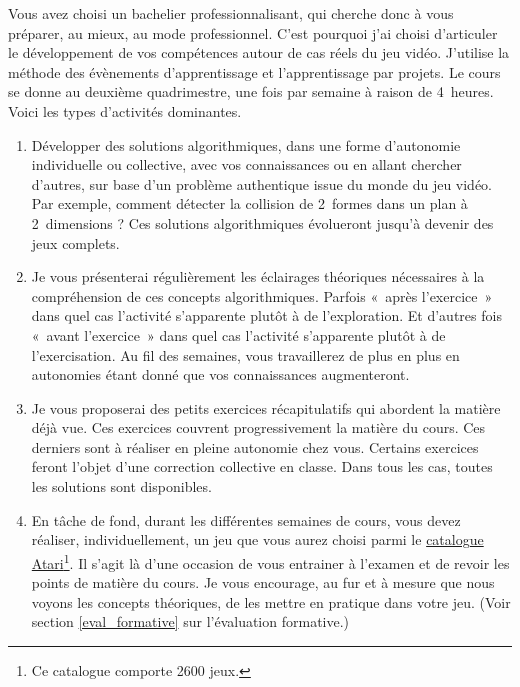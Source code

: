 Vous avez choisi un bachelier professionnalisant, qui cherche donc à vous préparer, au mieux, au mode professionnel. C’est  pourquoi j’ai choisi d’articuler le développement de vos compétences autour de cas réels du jeu vidéo. J'utilise la méthode des évènements d’apprentissage\cite{Leclercqevenements} et l'apprentissage par projets\cite{proulx2004apprentissage}.
Le cours se donne au deuxième quadrimestre, une fois par semaine à raison de 4~heures. Voici les types d'activités dominantes.
\begin{enumerate}
    \item Développer des solutions algorithmiques, dans une forme d’autonomie individuelle ou collective, avec vos connaissances ou en allant chercher d’autres, sur base d’un problème authentique issue du monde du jeu vidéo. Par exemple, comment détecter la collision de 2~formes dans un plan à 2~dimensions ? Ces solutions algorithmiques évolueront jusqu'à devenir des jeux complets.
    \item Je vous présenterai régulièrement les éclairages théoriques nécessaires à la compréhension de ces concepts algorithmiques. Parfois «~après l’exercice~» dans quel cas l’activité s’apparente plutôt à de l’exploration. Et d’autres fois «~avant l’exercice~» dans quel cas l’activité s’apparente plutôt à de l’exercisation. Au fil des semaines, vous travaillerez de plus en plus en autonomies étant donné que vos connaissances augmenteront.
    \item Je vous proposerai des petits exercices récapitulatifs qui abordent la matière déjà vue. Ces exercices couvrent progressivement la matière du cours. Ces derniers sont à réaliser en pleine autonomie chez vous. Certains exercices feront l'objet d'une correction collective en classe. Dans tous les cas, toutes les solutions sont disponibles.
    \item En tâche de fond, durant les différentes semaines de cours, vous devez réaliser, individuellement, un jeu que vous aurez choisi parmi le \href{https://fr.wikipedia.org/wiki/Liste_de_jeux_Atari_2600}{catalogue Atari}\footnote{Ce catalogue comporte 2600 jeux.}. Il s’agit là d’une occasion de vous entrainer à l’examen et de revoir les points de matière du cours. Je vous encourage, au fur et à mesure que nous voyons les concepts théoriques, de les mettre en pratique dans votre jeu. (Voir section \ref{eval_formative} sur l'évaluation formative.)
\end{enumerate}

\clearpage

